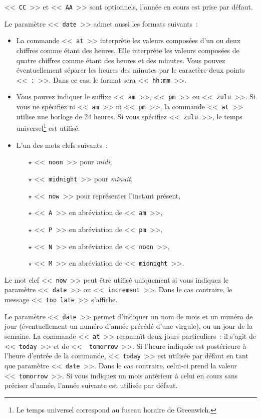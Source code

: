 <<~{\tt CC}~>> et <<~{\tt AA}~>> sont optionnels, l'ann{\'e}e en cours est prise par d{\'e}faut.

Le param{\`e}tre <<~{\tt date}~>> admet aussi les formats suivants~:
\begin{itemize}
	\item	La commande <<~{\tt at}~>> interpr{\`e}te les valeurs compos{\'e}es d'un ou deux chiffres
			comme {\'e}tant des heures. Elle interpr{\`e}te les valeurs compos{\'e}es de quatre chiffres
			comme {\'e}tant des heures et des minutes. Vous pouvez {\'e}ventuellement s{\'e}parer les heures
			des minutes par le caract{\`e}re deux points <<~{\tt :}~>>. Dans ce cas, le format sera
			<<~{\tt hh:mm}~>>.
	\item	Vous pouvez indiquer le suffixe <<~{\tt am}~>>, <<~{\tt pm}~>> ou <<~{\tt zulu}~>>.
			Si vous ne sp{\'e}cifiez ni <<~{\tt am}~>> ni <<~{\tt pm}~>>, la commande <<~{\tt at}~>>
			utilise une horloge de 24 heures. Si vous sp{\'e}cifiez <<~{\tt zulu}~>>, le temps
			universel\footnote{Le temps universel correspond au fuseau horaire de Greenwich.}
			est utilis{\'e}.
	\item	L'un des mots clefs suivants~:
		\begin{itemize}
			\item[$\star$]	<<~{\tt noon}~>> pour {\sl midi},
			\item[$\star$]	<<~{\tt midnight}~>> pour {\sl minuit},
			\item[$\star$]	<<~{\tt now}~>> pour repr{\'e}senter l'instant pr{\'e}sent,
			\item[$\star$]	<<~{\tt A}~>> en abr{\'e}viation de <<~{\tt am}~>>,
			\item[$\star$]	<<~{\tt P}~>> en abr{\'e}viation de <<~{\tt pm}~>>,
			\item[$\star$]	<<~{\tt N}~>> en abr{\'e}viation de <<~{\tt noon}~>>,
			\item[$\star$]	<<~{\tt M}~>> en abr{\'e}viation de <<~{\tt midnight}~>>.
		\end{itemize}
\end{itemize}

\begin{remarque}
	Le mot clef <<~{\tt now}~>> peut {\^e}tre utilis{\'e} uniquement si vous indiquez le param{\`e}tre
	<<~{\tt date}~>> ou <<~{\tt increment}~>>. Dans le cas contraire, le message
	<<~{\tt too late}~>> s'affiche.
\end{remarque}

Le param{\`e}tre <<~{\tt date}~>> permet d'indiquer un nom de mois et un
num{\'e}ro de jour ({\'e}ventuellement un num{\'e}ro d'ann{\'e}e pr{\'e}c{\'e}d{\'e} d'une virgule),
ou un jour de la semaine. La commande <<~{\tt at}~>> reconna{\^\i}t deux
jours particuliers~: il s'agit de <<~{\tt today}~>> et de <<~{\tt
tomorrow}~>>. Si l'heure indiqu{\'e}e est post{\'e}rieure {\`a} l'heure d'entr{\'e}e de
la commande, <<~{\tt today}~>> est utilis{\'e}e par d{\'e}faut en tant que
param{\`e}tre <<~{\tt date}~>>. Dans le cas contraire, celui-ci prend la
valeur <<~{\tt tomorrow}~>>. Si vous indiquez un mois ant{\'e}rieur {\`a} celui
en cours sans pr{\'e}ciser d'ann{\'e}e, l'ann{\'e}e suivante est utilis{\'e}e par
d{\'e}faut.

